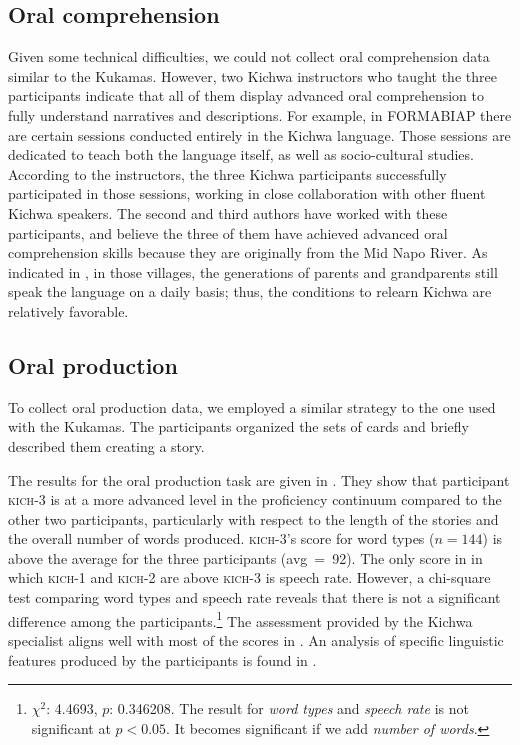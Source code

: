 \documentclass[output=paper]{langscibook}
\begin{document}
\subsection{{Oral comprehension}}

Given some technical difficulties, we could not collect oral comprehension data similar to the Kukamas. However, two Kichwa instructors who taught the three participants indicate that all of them display advanced oral comprehension to fully understand narratives and descriptions. For example, in FORMABIAP there are certain sessions conducted entirely in the Kichwa language. Those sessions are dedicated to teach both the language itself, as well as socio-cultural studies. According to the instructors, the three Kichwa participants successfully participated in those sessions, working in close collaboration with other fluent Kichwa speakers. The second and third authors have worked with these participants, and believe the three of them have achieved advanced oral comprehension skills because they are originally from the Mid Napo River. As indicated in , in those villages, the generations of parents and grandparents still speak the language on a daily basis; thus, the conditions to relearn Kichwa are relatively favorable.

\subsection{{{Oral production}}}

To collect oral production data, we employed a similar strategy to the one used with the Kukamas. The participants organized the sets of cards and briefly described them creating a story.

The results for the oral production task are given in . They show that participant \textsc{kich}{}-3 is at a more advanced level in the proficiency continuum compared to the other two participants, particularly with respect to the length of the stories and the overall number of words produced. \textsc{kich}{}-3’s score for word types ($n = 144$) is above the average for the three participants (avg~=~92). The only score in in which \textsc{kich}{}-1 and \textsc{kich}{}-2 are above \textsc{kich}{}-3 is speech rate. However, a chi-square test comparing word types and speech rate reveals that there is not a significant difference among the participants.\footnote{$\chi^2$: 4.4693, $p$: 0.346208. The result for \textit{word types} and \textit{speech rate} is not significant at $p<0.05$. It becomes significant if we add \textit{number of words}.} The assessment provided by the Kichwa specialist aligns well with most of the scores in . An analysis of specific linguistic features produced by the participants is found in .
\end{document}
